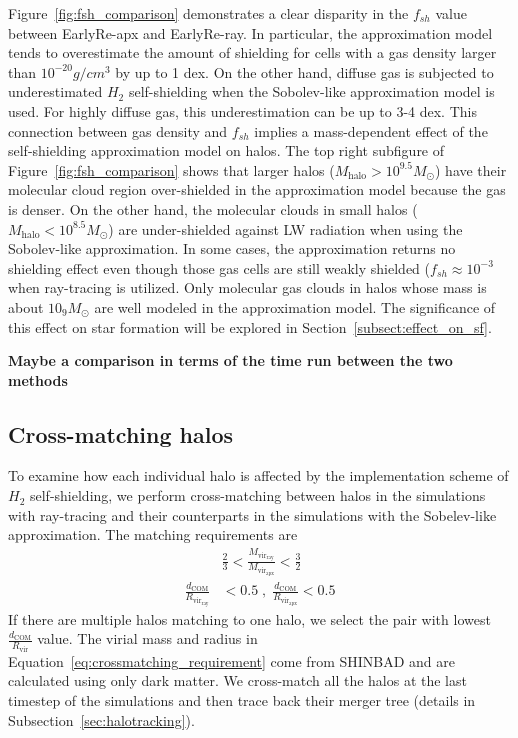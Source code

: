 \documentclass[linenumbers, twocolumn]{aastex631}
\begin{document}
Figure~\ref{fig:fsh_comparison} demonstrates a clear disparity in the $f_{sh}$ value between EarlyRe-apx and EarlyRe-ray. In particular, the approximation model tends to overestimate the amount of shielding for cells with a gas density larger than $10^{-20} g/cm^3$ by up to 1 dex. On the other hand, diffuse gas is subjected to underestimated $H_{2}$ self-shielding when the Sobolev-like approximation model is used. For highly diffuse gas, this underestimation can be up to 3-4 dex. This connection between gas density and $f_{sh}$ implies a mass-dependent effect of the self-shielding approximation model on halos. The top right subfigure of Figure~\ref{fig:fsh_comparison} shows that larger halos ($M_{\text{halo}} > 10^{9.5} M_{\odot}$) have their molecular cloud region over-shielded in the approximation model because the gas is denser. On the other hand, the molecular clouds in small halos ($M_{\text{halo}} < 10^{8.5} M_{\odot}$) are under-shielded against LW radiation when using the Sobolev-like approximation. In some cases, the approximation returns no shielding effect even though those gas cells are still weakly shielded ($f_{sh} \approx 10^{-3}$ when ray-tracing is utilized. Only molecular gas clouds in halos whose mass is about $10_{9} M_\odot$ are well modeled in the approximation model. The significance of this effect on star formation will be explored in Section~\ref{subsect:effect_on_sf}.

\textbf{Maybe a comparison in terms of the time run between the two methods}

\subsection{Cross-matching halos}
\label{subsect:cross-matching_halos}
To examine how each individual halo is affected by the implementation scheme of $H_{2}$ self-shielding, we perform cross-matching between halos in the simulations with ray-tracing and their counterparts in the simulations with the Sobelev-like approximation. The matching requirements are
\begin{align}
    & \frac{2}{3} < \frac{M_{\mathrm{vir}_{\mathrm{ray}}}}{M_{\mathrm{vir}_{\mathrm{apx}}}} < \frac{3}{2} \nonumber \\
    \frac{d_{\text{COM}}}{R_{\mathrm{vir}_{\mathrm{ray}}}} & < 0.5 \; , \; \frac{d_{\text{COM}}}{R_{\mathrm{vir}_{\mathrm{apx}}}} < 0.5 
\label{eq:crossmatching_requirement}
\end{align}
If there are multiple halos matching to one halo, we select the pair with lowest $\frac{d_{\text{COM}}}{R_{\mathrm{vir}}}$ value. The virial mass and radius in Equation~\ref{eq:crossmatching_requirement} come from SHINBAD and are calculated using only dark matter. We cross-match all the halos at the last timestep of the simulations and then trace back their merger tree (details in Subsection~\ref{sec:halotracking}).
\end{document}
